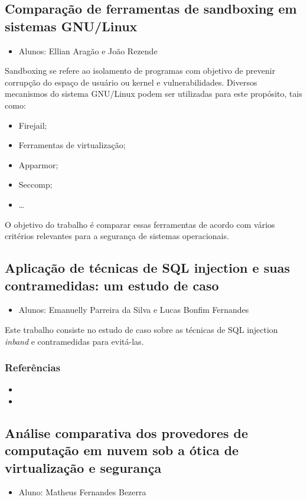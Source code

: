 \documentclass{article}
\newcommand*{\nsubsection}[1]{
    \subsection*{#1}
}
\begin{document}
\nsubsection{Comparação de ferramentas de sandboxing em sistemas GNU/Linux}

\begin{itemize}
	\item Alunos: Ellian Aragão e João Rezende
\end{itemize}
Sandboxing se refere ao isolamento de programas com objetivo de prevenir corrupção do espaço de usuário ou kernel e vulnerabilidades. Diversos mecanismos do sistema GNU/Linux podem ser utilizadas para este propósito, tais como: 
\begin{itemize}
	\item Firejail;
	\item Ferramentas de virtualização;
	\item Apparmor;
	\item Seccomp;
	\item \ldots
\end{itemize}



O objetivo do trabalho é comparar essas ferramentas de acordo com vários critérios relevantes para a segurança de sistemas operacionais.

\nsubsection{Aplicação de técnicas de SQL injection e suas contramedidas: um estudo de caso}

\begin{itemize}
	\item Alunos: Emanuelly Parreira da Silva e Lucas Bonfim Fernandes
\end{itemize}


Este trabalho consiste no estudo de caso sobre as técnicas de SQL injection {\it inband} e contramedidas para evitá-las. 



\subsubsection*{Referências}
\begin{itemize}
	\item {}	
	\item {}
\end{itemize}

\nsubsection{Análise comparativa dos provedores de computação em nuvem sob a ótica de virtualização e segurança}

\begin{itemize}
	\item Aluno: Matheus Fernandes Bezerra
\end{itemize}
\end{document}
